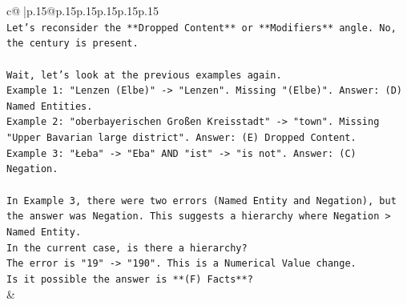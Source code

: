 \documentclass{article}
\begin{document}
{\begin{supertabular}{c@{$\;$}|p{.15\linewidth}@{}p{.15\linewidth}p{.15\linewidth}p{.15\linewidth}p{.15\linewidth}p{.15\linewidth}}
{{{\\ 
\texttt{Let's reconsider the **Dropped Content** or **Modifiers** angle. No, the century is present.} \\
\\ 
\texttt{Wait, let's look at the previous examples again.} \\
\texttt{Example 1: "Lenzen (Elbe)" {-}> "Lenzen". Missing "(Elbe)". Answer: (D) Named Entities.} \\
\texttt{Example 2: "oberbayerischen Großen Kreisstadt" {-}> "town". Missing "Upper Bavarian large district". Answer: (E) Dropped Content.} \\
\texttt{Example 3: "Łeba" {-}> "Eba" AND "ist" {-}> "is not". Answer: (C) Negation.} \\
\\ 
\texttt{In Example 3, there were two errors (Named Entity and Negation), but the answer was Negation. This suggests a hierarchy where Negation > Named Entity.} \\
\texttt{In the current case, is there a hierarchy?} \\
\texttt{The error is "19" {-}> "190". This is a Numerical Value change.} \\
\texttt{Is it possible the answer is **(F) Facts**?} \\
            }
        }
    }
    & \\ \\

\end{supertabular}
}
\end{document}
